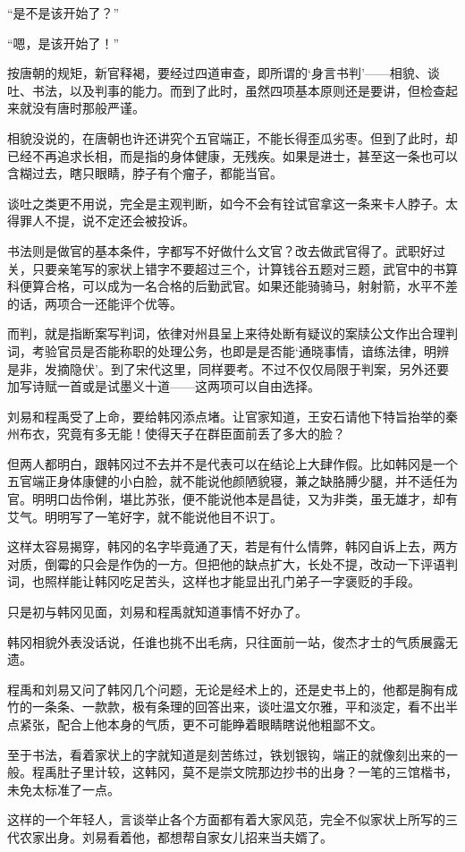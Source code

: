 “是不是该开始了？”

“嗯，是该开始了！”

按唐朝的规矩，新官释褐，要经过四道审查，即所谓的‘身言书判’——相貌、谈吐、书法，以及判事的能力。而到了此时，虽然四项基本原则还是要讲，但检查起来就没有唐时那般严谨。

相貌没说的，在唐朝也许还讲究个五官端正，不能长得歪瓜劣枣。但到了此时，却已经不再追求长相，而是指的身体健康，无残疾。如果是进士，甚至这一条也可以含糊过去，瞎只眼睛，脖子有个瘤子，都能当官。

谈吐之类更不用说，完全是主观判断，如今不会有铨试官拿这一条来卡人脖子。太得罪人不提，说不定还会被投诉。

书法则是做官的基本条件，字都写不好做什么文官？改去做武官得了。武职好过关，只要亲笔写的家状上错字不要超过三个，计算钱谷五题对三题，武官中的书算科便算合格，可以成为一名合格的后勤武官。如果还能骑骑马，射射箭，水平不差的话，两项合一还能评个优等。

而判，就是指断案写判词，依律对州县呈上来待处断有疑议的案牍公文作出合理判词，考验官员是否能称职的处理公务，也即是是否能‘通晓事情，谙练法律，明辨是非，发摘隐伏’。到了宋代这里，同样要考。不过不仅仅局限于判案，另外还要加写诗赋一首或是试墨义十道——这两项可以自由选择。

刘易和程禹受了上命，要给韩冈添点堵。让官家知道，王安石请他下特旨抬举的秦州布衣，究竟有多无能！使得天子在群臣面前丢了多大的脸？

但两人都明白，跟韩冈过不去并不是代表可以在结论上大肆作假。比如韩冈是一个五官端正身体康健的小白脸，就不能说他颜陋貌寝，兼之缺胳膊少腿，并不适任为官。明明口齿伶俐，堪比苏张，便不能说他本是昌徒，又为非类，虽无雄才，却有艾气。明明写了一笔好字，就不能说他目不识丁。

这样太容易揭穿，韩冈的名字毕竟通了天，若是有什么情弊，韩冈自诉上去，两方对质，倒霉的只会是作伪的一方。但把他的缺点扩大，长处不提，改动一下评语判词，也照样能让韩冈吃足苦头，这样也才能显出孔门弟子一字褒贬的手段。

只是初与韩冈见面，刘易和程禹就知道事情不好办了。

韩冈相貌外表没话说，任谁也挑不出毛病，只往面前一站，俊杰才士的气质展露无遗。

程禹和刘易又问了韩冈几个问题，无论是经术上的，还是史书上的，他都是胸有成竹的一条条、一款款，极有条理的回答出来，谈吐温文尔雅，平和淡定，看不出半点紧张，配合上他本身的气质，更不可能睁着眼睛瞎说他粗鄙不文。

至于书法，看着家状上的字就知道是刻苦练过，铁划银钩，端正的就像刻出来的一般。程禹肚子里计较，这韩冈，莫不是崇文院那边抄书的出身？一笔的三馆楷书，未免太标准了一点。

这样的一个年轻人，言谈举止各个方面都有着大家风范，完全不似家状上所写的三代农家出身。刘易看着他，都想帮自家女儿招来当夫婿了。


